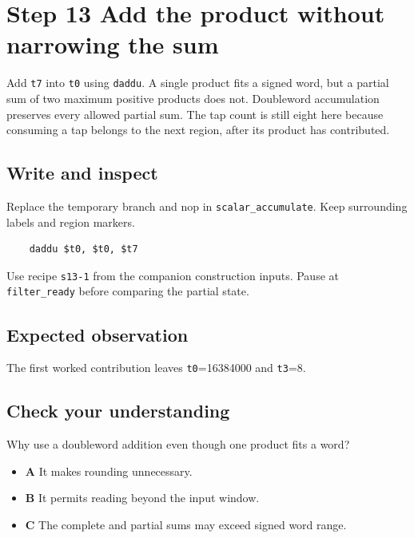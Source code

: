 \section{Step 13 Add the product without narrowing the sum}\label{fir-s13}

Add \texttt{t7} into \texttt{t0} using \texttt{daddu}. A single product fits a signed word, but a partial sum of two maximum positive products does not. Doubleword accumulation preserves every allowed partial sum. The tap count is still eight here because consuming a tap belongs to the next region, after its product has contributed.

\subsection{Write and inspect}
Replace the temporary branch and nop in \texttt{scalar\_accumulate}. Keep surrounding labels and region markers.

\begin{verbatim}
    daddu $t0, $t0, $t7
\end{verbatim}
Use recipe \texttt{s13-1} from the companion construction inputs. Pause at \texttt{filter\_ready} before comparing the partial state.

\subsection{Expected observation}
The first worked contribution leaves \texttt{t0}=16384000 and \texttt{t3}=8.

\subsection{Check your understanding}
Why use a doubleword addition even though one product fits a word?

\begin{itemize}
  \item \textbf{A} It makes rounding unnecessary.
  \item \textbf{B} It permits reading beyond the input window.
  \item \textbf{C} The complete and partial sums may exceed signed word range.
\end{itemize}
